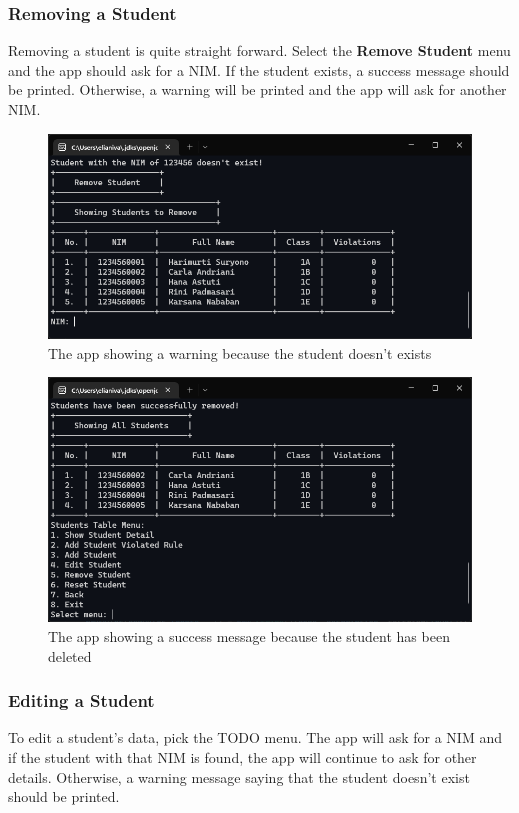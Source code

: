 \documentclass[12pt,titlepage]{article}
\begin{document}
\pagebreak

\subsubsection{Removing a Student}
Removing a student is quite straight forward. Select the \textbf{Remove Student} menu and the app should ask for a NIM.
If the student exists, a success message should be printed. Otherwise, a warning will be printed and
the app will ask for another NIM.

\begin{figure}[h]
    \centering
    \includegraphics[width=.8\textwidth]{images/remove-student-warning.png}
    \caption{The app showing a warning because the student doesn't exists}
\end{figure}

\begin{figure}[h]
    \centering
    \includegraphics[width=.8\textwidth]{images/remove-student-success.png}
    \caption{The app showing a success message because the student has been deleted}
\end{figure}

\pagebreak

\subsubsection{Editing a Student}
To edit a student's data, pick the TODO menu. The app will ask for a NIM and if the student with that NIM is found,
the app will continue to ask for other details. Otherwise, a warning message saying that the student doesn't exist should be printed.
\end{document}
